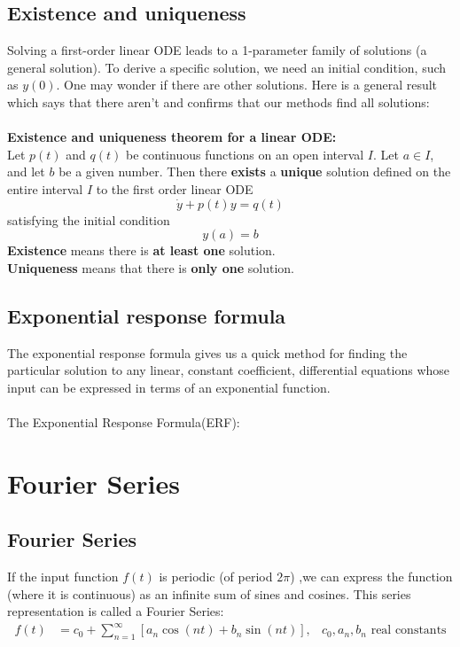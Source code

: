 \documentclass{report}
\begin{document}
\subsection{Existence and uniqueness} %
Solving a first-order linear ODE leads to a 1-parameter family of solutions (a general solution).
To derive a specific solution, we need an initial condition, such as $y(0)$. One may wonder if
there are other solutions. Here is a general result which says that there aren't and confirms 
that our methods find all solutions:\\
\vspace{2mm}\\
\textbf{Existence and uniqueness theorem for a linear ODE:}\\
Let $p(t)$ and $q(t)$ be continuous functions on an open interval $I$. Let $a\in I$, and let $b$
be a given number. Then there \textbf{exists} a \textbf{unique} solution defined on the entire 
interval $I$ to the first order linear ODE
\begin{equation*}
\dot{y}+p(t)y=q(t)
\end{equation*}
satisfying the initial condition
\begin{equation*}
y(a)=b
\end{equation*}
\textbf{Existence} means there is \textbf{at least one} solution.\\
\textbf{Uniqueness} means that there is \textbf{only one} solution.

\subsection{Exponential response formula}
The exponential response formula gives us a quick method for finding the particular solution to 
any linear, constant coefficient, differential equations whose input can be expressed in terms
of an exponential function.\\
\vspace{2mm}\\
The Exponential Response Formula(ERF): 

\section{Fourier Series}
\subsection{Fourier Series}
If the input function $f(t)$ is periodic (of period $2\pi$)
,we can express the function (where it is continuous) as an
infinite sum of sines and cosines.
This series representation is called a Fourier Series:
\begin{align*}
f(t)&=c_0+\sum_{n=1}^{\infty}[a_n\cos(nt)+b_n\sin(nt)], 
& \text{$c_0, a_n, b_n$ real constants}
\end{align*}
\end{document}
